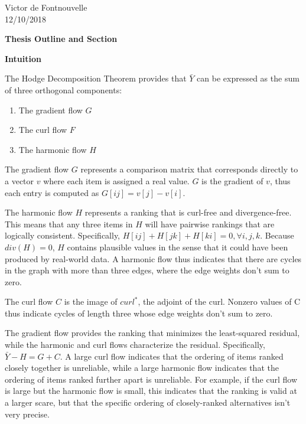 \documentclass{article}
\begin{document}
\noindent Victor de Fontnouvelle
\\ 12/10/2018
\begin{center}
\textbf{Thesis Outline and Section}
\end{center}

\bigskip
{}
\bigskip

\bigskip
{}
\bigskip

\bigskip
{}
\bigskip

\bigskip
\noindent\textbf{Intuition}
\bigskip

The Hodge Decomposition Theorem provides that $\bar{Y}$ can be expressed as the sum of three orthogonal components:

\begin{enumerate}
	\item The gradient flow $G$
	\item The curl flow $F$
	\item The harmonic flow $H$
\end{enumerate}

The gradient flow $G$ represents a comparison matrix that corresponds directly to a vector $v$ where each item is assigned a real value.
$G$ is the gradient of $v$, thus each entry is computed as $G[ij] = v[j] - v[i]$.

The harmonic flow $H$ represents a ranking that is curl-free and divergence-free.
This means that any three items in $H$ will have pairwise rankings that are logically consistent.
Specifically, $H[ij] + H[jk] + H[ki] = 0, \forall i,j,k$.
Because $div(H)=0$, $H$ contains plausible values in the sense that it could have been produced by real-world data.
A harmonic flow thus indicates that there are cycles in the graph with more than three edges, where the edge weights don't sum to zero.

The curl flow $C$ is the image of $curl^*$, the adjoint of the curl.
Nonzero values of C thus indicate cycles of length three whose edge weights don't sum to zero.

The gradient flow provides the ranking that minimizes the least-squared residual, while the harmonic and curl flows characterize the residual.
Specifically, $\bar{Y} - H = G + C$.
A large curl flow indicates that the ordering of items ranked closely together is unreliable,
while a large harmonic flow indicates that the ordering of items ranked further apart is unreliable.
For example, if the curl flow is large but the harmonic flow is small, this indicates that the ranking is valid at a larger scare,
but that the specific ordering of closely-ranked alternatives isn't very precise.
\end{document}
